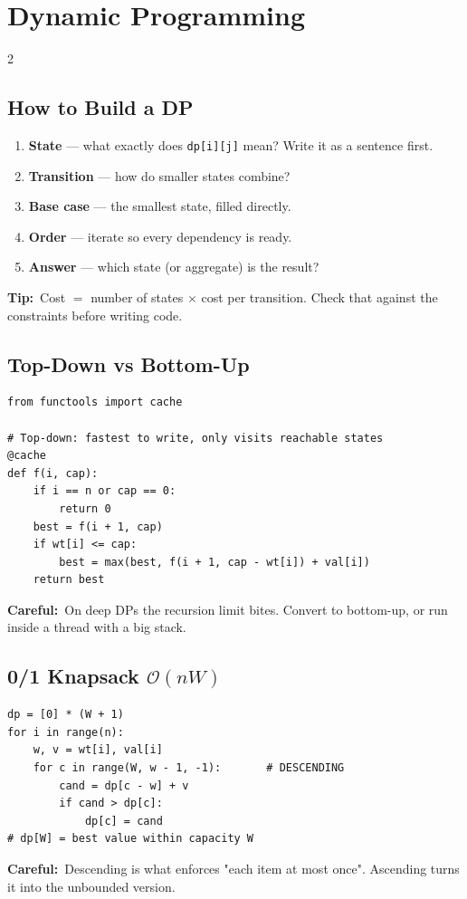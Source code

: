 \documentclass[10pt]{article}
\newcommand{\code}[1]{\texttt{\small #1}}
\newcommand{\sub}[2]{\subsection[#1]{#1\hspace{0.6em}%
  \textnormal{\color{accent2}\small$\mathcal{O}(#2)$}}}
\newcommand{\tip}[1]{{\color{tipc}\footnotesize\textbf{Tip:}}~{\footnotesize #1}\par}
\newcommand{\warn}[1]{{\color{warnc}\footnotesize\textbf{Careful:}}~{\footnotesize #1}\par}
\begin{document}
\section{Dynamic Programming}
\begin{multicols}{2}

\subsection{How to Build a DP}
\begin{enumerate}
    \item \textbf{State} --- what exactly does \code{dp[i][j]} mean?
          Write it as a sentence first.
    \item \textbf{Transition} --- how do smaller states combine?
    \item \textbf{Base case} --- the smallest state, filled directly.
    \item \textbf{Order} --- iterate so every dependency is ready.
    \item \textbf{Answer} --- which state (or aggregate) is the result?
\end{enumerate}
\tip{Cost $=$ number of states $\times$ cost per transition. Check that
against the constraints before writing code.}

\subsection{Top-Down vs Bottom-Up}
\begin{lstlisting}
from functools import cache

# Top-down: fastest to write, only visits reachable states
@cache
def f(i, cap):
    if i == n or cap == 0:
        return 0
    best = f(i + 1, cap)
    if wt[i] <= cap:
        best = max(best, f(i + 1, cap - wt[i]) + val[i])
    return best
\end{lstlisting}
\warn{On deep DPs the recursion limit bites. Convert to bottom-up, or
run inside a thread with a big stack.}

\sub{0/1 Knapsack}{nW}
\begin{lstlisting}
dp = [0] * (W + 1)
for i in range(n):
    w, v = wt[i], val[i]
    for c in range(W, w - 1, -1):       # DESCENDING
        cand = dp[c - w] + v
        if cand > dp[c]:
            dp[c] = cand
# dp[W] = best value within capacity W
\end{lstlisting}
\warn{Descending is what enforces "each item at most once". Ascending
turns it into the unbounded version.}


\end{multicols}
\end{document}
